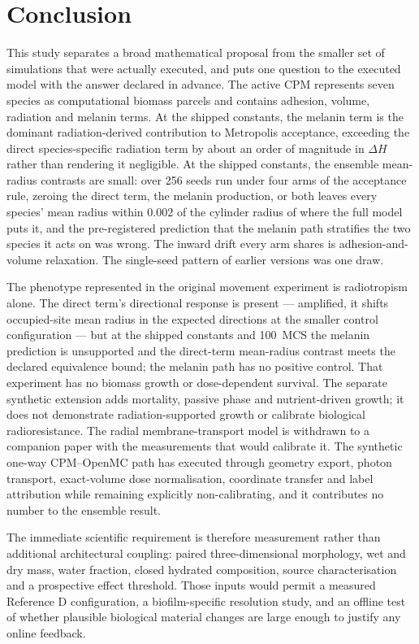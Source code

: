 \documentclass[11pt]{article}
\begin{document}
\section{Conclusion}

This study separates a broad mathematical proposal from the smaller set of simulations that were
actually executed, and puts one question to the executed model with the answer declared in
advance. The active CPM represents seven species as computational biomass parcels and
contains adhesion, volume, radiation and melanin terms. At the shipped constants, the melanin term
is the dominant radiation-derived contribution to Metropolis acceptance, exceeding the direct
species-specific radiation term by about an order of magnitude in $\Delta H$ rather than rendering it
negligible. At the shipped constants, the ensemble mean-radius contrasts are small: over 256 seeds run under four arms of the acceptance
rule, zeroing the direct term, the melanin production, or both leaves every species' mean radius
within $0.002$ of the cylinder radius of where the full model puts it, and the pre-registered
prediction that the melanin path stratifies the two species it acts on was wrong. The inward
drift every arm shares is adhesion-and-volume relaxation. The single-seed pattern of earlier
versions was one draw.

The phenotype represented in the original movement experiment is radiotropism alone. The direct term's directional response is present --- amplified, it shifts occupied-site mean radius in the expected directions at the smaller control configuration ---
but at the shipped constants and 100~MCS the melanin prediction is unsupported and the direct-term mean-radius contrast meets the declared equivalence bound; the melanin path has no positive control. That experiment has no biomass growth or dose-dependent survival. The separate synthetic
extension adds mortality, passive phase and nutrient-driven growth; it does not demonstrate
radiation-supported growth or calibrate biological radioresistance. The radial membrane-transport model is
withdrawn to a companion paper with the measurements that would calibrate it. The synthetic one-way
CPM--OpenMC path has executed through geometry export, photon transport, exact-volume dose
normalisation, coordinate transfer and label attribution while remaining explicitly
non-calibrating, and it contributes no number to the ensemble result.

The immediate scientific requirement is therefore measurement rather than additional architectural
coupling: paired three-dimensional morphology, wet and dry mass, water fraction, closed hydrated
composition, source characterisation and a prospective effect threshold. Those inputs would permit
a measured Reference D configuration, a biofilm-specific resolution study, and an offline test of
whether plausible biological material changes are large enough to justify any online feedback.
\end{document}
